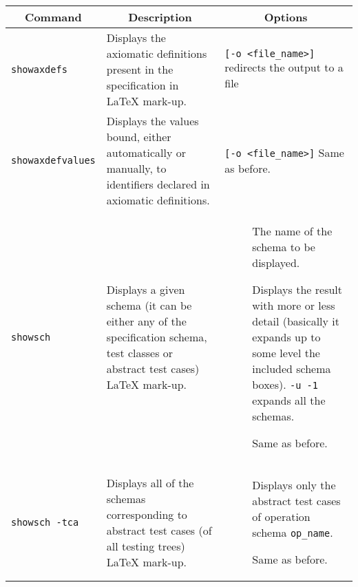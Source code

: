 \vspace{5mm}\noindent\begin{longtable}{|p{3.3cm}|p{7cm}|p{6.3cm}|}\hline
\multicolumn{1}{|c}{{\bf Command}} & \multicolumn{1}{|c|}{{\bf Description}} & \multicolumn{1}{c|}{{\bf Options}} \\\hline
\endhead

\verb+showaxdefs+ & Displays the axiomatic definitions present in the specification in \LaTeX{} mark-up. & \verb+[-o <file_name>]+ redirects the output to a file\\\hline

\verb+showaxdefvalues+ & Displays the values bound, either automatically or manually, to identifiers declared in axiomatic definitions. & \verb+[-o <file_name>]+ Same as before.\\\hline

\verb+showsch+ & Displays a given schema (it can be either any of the specification schema, test classes or abstract test cases) \LaTeX{} mark-up. & 
\begin{description}
\item[{\tt <sch\_name>}]\mbox{}

The name of the schema to be displayed.

\item[{\tt [-u <unfold\_order>]}]\mbox{}

Displays the result with more or less detail (basically it expands up to some level the included schema boxes). \verb+-u -1+ expands all the schemas.

\item[{\tt [-o <file\_name>]}]\mbox{}

Same as before.
\end{description} \\\hline

\verb+showsch -tca+ & Displays all of the schemas corresponding to abstract test cases (of all testing trees) \LaTeX{} mark-up. &
\begin{description}
\item[{\tt [-p <op\_name>]}]\mbox{}

Displays only the abstract test cases of operation schema \verb+op_name+.

\item[{\tt [-u <unfold\_order>]}]\mbox{}

Same as before.

\item[{\tt [-o <file\_name>]}]\mbox{}


\end{description}
\end{longtable}
